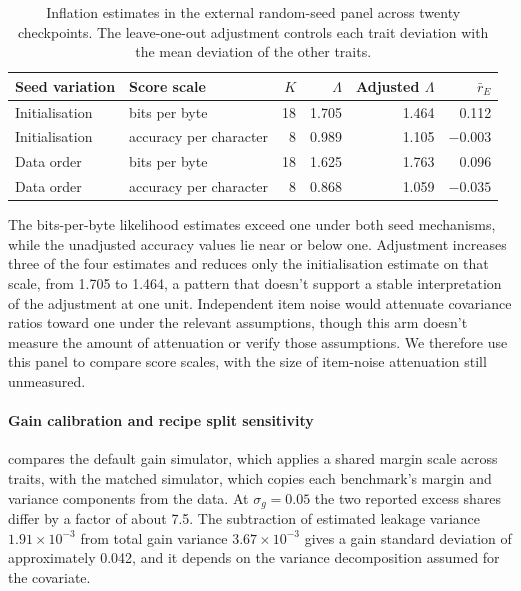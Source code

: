 \begin{table}[!htb]
\centering
\caption{Inflation estimates in the external random-seed panel across twenty checkpoints. The leave-one-out adjustment controls each trait deviation with the mean deviation of the other traits.}
\label{tab:original12}
\small\setlength{\tabcolsep}{4pt}\renewcommand{\arraystretch}{1.12}
\begin{tabular}{llrrrr}\toprule
Seed variation & Score scale & $K$ & $\Lambda$ & Adjusted $\Lambda$ & $\bar r_E$\\\midrule
Initialisation & bits per byte & 18 & 1.705 & 1.464 & 0.112\\
Initialisation & accuracy per character & 8 & 0.989 & 1.105 & $-0.003$\\
Data order & bits per byte & 18 & 1.625 & 1.763 & 0.096\\
Data order & accuracy per character & 8 & 0.868 & 1.059 & $-0.035$\\\bottomrule
\end{tabular}
\end{table}

The bits-per-byte likelihood estimates exceed one under both seed mechanisms, while the unadjusted accuracy values lie near or below one. Adjustment increases three of the four estimates and reduces only the initialisation estimate on that scale, from 1.705 to 1.464, a pattern that doesn't support a stable interpretation of the adjustment at one unit. Independent item noise would attenuate covariance ratios toward one under the relevant assumptions, though this arm doesn't measure the amount of attenuation or verify those assumptions. We therefore use this panel to compare score scales, with the size of item-noise attenuation still unmeasured.

\paragraph{Gain calibration and recipe split sensitivity}

 compares the default gain simulator, which applies a shared margin scale across traits, with the matched simulator, which copies each benchmark's margin and variance components from the data. At $\sigma_g=0.05$ the two reported excess shares differ by a factor of about 7.5. The subtraction of estimated leakage variance $1.91\times10^{-3}$ from total gain variance $3.67\times10^{-3}$ gives a gain standard deviation of approximately 0.042, and it depends on the variance decomposition assumed for the covariate.

